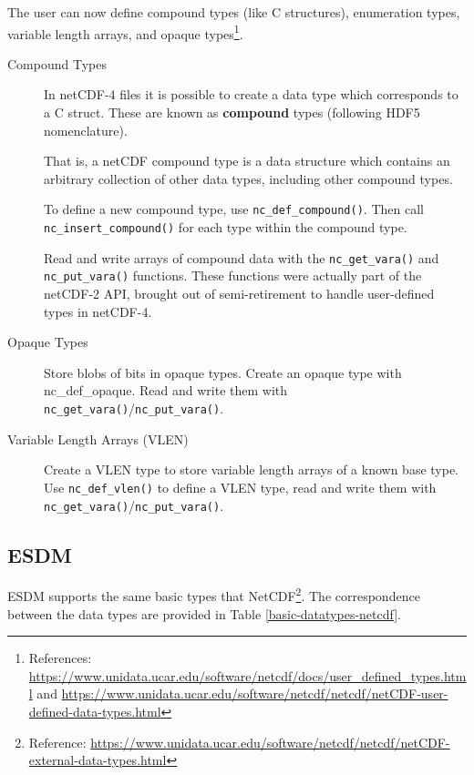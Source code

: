 \tab
The user can now define compound types (like C structures), enumeration types, variable length arrays, and opaque types\footnote{References: \url{https://www.unidata.ucar.edu/software/netcdf/docs/user\_defined\_types.html} and \url{https://www.unidata.ucar.edu/software/netcdf/netcdf/netCDF-user-defined-data-types.html}}.

\begin{description}

\item[Compound Types]

In netCDF-4 files it is possible to create a data type which corresponds to a C struct. These are known as \textbf{compound} types (following HDF5 nomenclature).

That is, a netCDF compound type is a data structure which contains an arbitrary collection of other data types, including other compound types.

To define a new compound type, use \texttt{nc\_def\_compound()}. Then call \texttt{nc\_insert\_compound()} for each type within the compound type.

Read and write arrays of compound data with the \texttt{nc\_get\_vara()} and \texttt{nc\_put\_vara()} functions. These functions were actually part of the netCDF-2 API, brought out of semi-retirement to handle user-defined types in netCDF-4.

\item[Opaque Types]

Store blobs of bits in opaque types. Create an opaque type with nc\_def\_opaque. Read and write them with \texttt{nc\_get\_vara()}/\texttt{nc\_put\_vara()}.

\item[Variable Length Arrays (VLEN)]

Create a VLEN type to store variable length arrays of a known base type. Use \texttt{nc\_def\_vlen()} to define a VLEN type, read and write them with \texttt{nc\_get\_vara()}/\texttt{nc\_put\_vara()}.

\end{description}

\subsection{ESDM}

\tab
ESDM supports the same basic types that NetCDF\footnote{Reference: \url{https://www.unidata.ucar.edu/software/netcdf/netcdf/netCDF-external-data-types.html}}. The correspondence between the data types are provided in Table \ref{basic-datatypes-netcdf}.

